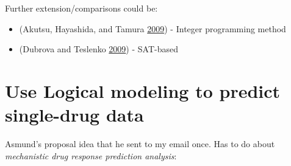 \documentclass[
  12pt,
]{book}
\providecommand{\tightlist}{%
  \setlength{\itemsep}{0pt}\setlength{\parskip}{0pt}}
\begin{document}
Further extension/comparisons could be:

\begin{itemize}
\tightlist
\item
  (Akutsu, Hayashida, and Tamura \protect\hyperlink{ref-Akutsu2009}{2009}) - Integer programming method
\item
  (Dubrova and Teslenko \protect\hyperlink{ref-Dubrova2009}{2009}) - SAT-based
\end{itemize}

\hypertarget{use-logical-modeling-to-predict-single-drug-data}{%
\section*{Use Logical modeling to predict single-drug data}\label{use-logical-modeling-to-predict-single-drug-data}}

Asmund's proposal idea that he sent to my email once.
Has to do about \emph{mechanistic drug response prediction analysis}:
\end{document}
